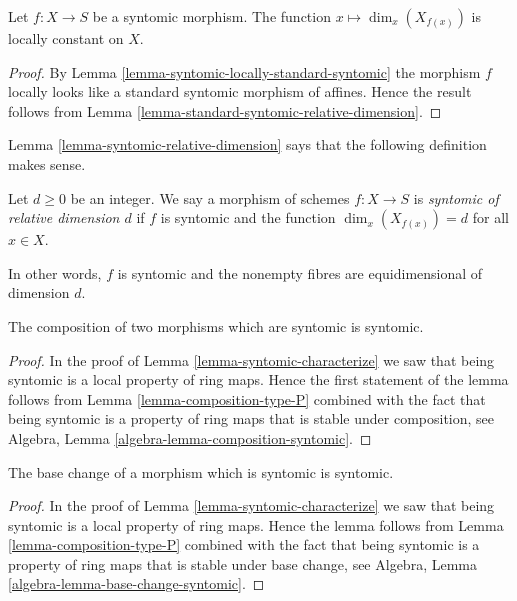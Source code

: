 \begin{lemma}
\label{lemma-syntomic-relative-dimension}
Let $f : X \to S$ be a syntomic morphism. The function
$x \mapsto \dim_x(X_{f(x)})$ is locally constant on $X$.
\end{lemma}

\begin{proof}
By Lemma \ref{lemma-syntomic-locally-standard-syntomic}
the morphism $f$ locally looks like a standard
syntomic morphism of affines. Hence the result follows
from Lemma \ref{lemma-standard-syntomic-relative-dimension}.
\end{proof}

\noindent
Lemma \ref{lemma-syntomic-relative-dimension}
says that the following definition makes sense.

\begin{definition}
\label{definition-syntomic-relative-dimension}
Let $d \geq 0$ be an integer. We say a morphism of schemes $f : X \to S$
is {\it syntomic of relative dimension $d$} if $f$ is syntomic and
the function $\dim_x(X_{f(x)}) = d$ for all $x \in X$.
\end{definition}

\noindent
In other words, $f$ is syntomic and the nonempty fibres are equidimensional
of dimension $d$.

\begin{lemma}
\label{lemma-composition-syntomic}
The composition of two morphisms which are syntomic is syntomic.
\end{lemma}

\begin{proof}
In the proof of Lemma \ref{lemma-syntomic-characterize}
we saw that being syntomic is a local property of ring maps.
Hence the first statement of the lemma follows from
Lemma \ref{lemma-composition-type-P} combined
with the fact that being syntomic is a property of ring maps that is
stable under composition, see
Algebra, Lemma \ref{algebra-lemma-composition-syntomic}.
\end{proof}

\begin{lemma}
\label{lemma-base-change-syntomic}
The base change of a morphism which is syntomic is syntomic.
\end{lemma}

\begin{proof}
In the proof of Lemma \ref{lemma-syntomic-characterize}
we saw that being syntomic is a local property of ring maps.
Hence the lemma follows from
Lemma \ref{lemma-composition-type-P} combined
with the fact that being syntomic is a property of ring maps that is
stable under base change, see
Algebra, Lemma \ref{algebra-lemma-base-change-syntomic}.
\end{proof}

